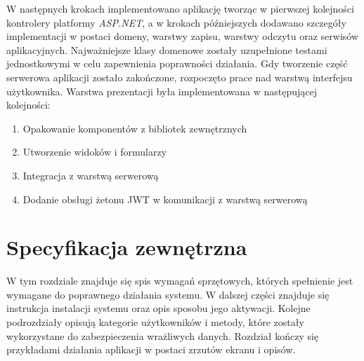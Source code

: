 \documentclass[a4paper,twoside,12pt]{book}
\begin{document}
	W następnych krokach implementowano aplikację tworząc w pierwszej kolejności kontrolery platformy \textit{ASP.NET}, a w krokach późniejszych dodawano szczegóły implementacji w postaci domeny, warstwy zapisu, warstwy odczytu oraz serwisów aplikacyjnych. Najważniejsze klasy domenowe zostały uzupełnione testami jednostkowymi w celu zapewnienia poprawności działania. Gdy tworzenie część serwerowa aplikacji zostało zakończone, rozpoczęto prace nad warstwą interfejsu użytkownika. Warstwa prezentacji była implementowana w następującej kolejności:
	\begin{enumerate}
		\item Opakowanie komponentów z bibliotek zewnętrznych
		\item Utworzenie widoków i formularzy
		\item Integracja z warstwą serwerową
		\item Dodanie obsługi żetonu JWT w komunikacji z warstwą serwerową
	\end{enumerate}

\chapter{Specyfikacja zewnętrzna}
\label{chap:external}
W tym rozdziale znajduje się spis wymagań sprzętowych, których spełnienie jest wymagane do poprawnego działania systemu. W dalszej części znajduje się instrukcja instalacji systemu oraz opis sposobu jego aktywacji. Kolejne podrozdziały opisują kategorie użytkowników i metody, które zostały wykorzystane do zabezpieczenia wrażliwych danych. Rozdział kończy się przykładami działania aplikacji w postaci zrzutów ekranu i opisów.
\end{document}
